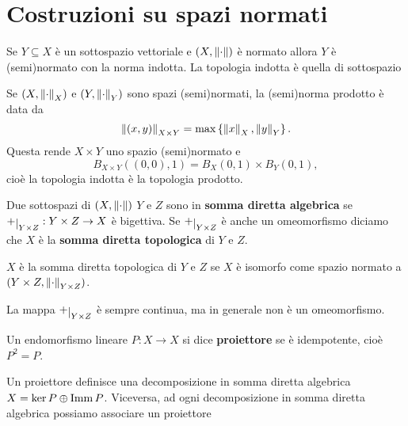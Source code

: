 \chapter{Costruzioni su spazi normati}



\begin{remark}
Se $Y\subseteq X$ \`e un sottospazio vettoriale e $(X,\left\Vert{\cdot}\right\Vert)$ \`e normato allora $Y$ \`e (semi)normato con la norma indotta. La topologia indotta \`e quella di sottospazio
\end{remark}

\begin{definition}
    Se $(X,\left\Vert{\cdot}\right\Vert_X)$ e $(Y,\left\Vert{\cdot}\right\Vert_Y)$ sono spazi (semi)normati, la (semi)norma prodotto \`e data da
    \[\left\Vert{(x,y)}\right\Vert_{X\times Y}=\max\left\{{\left\Vert{x}\right\Vert_X,\left\Vert{y}\right\Vert_Y}\right\}.\]
    Questa rende $X\times Y$ uno spazio (semi)normato e
    \[B_{X\times Y}((0,0),1)=B_X(0,1)\times B_Y(0,1),\]
    cio\`e la topologia indotta \`e la topologia prodotto.
\end{definition}

\begin{definition}
Due sottospazi di $(X,\left\Vert{\cdot}\right\Vert)$ $Y$ e $Z$ sono in \textbf{somma diretta algebrica} se $+\res{Y\times Z}:Y\times Z\to X$ \`e bigettiva. Se $+\res{Y\times Z}$ \`e anche un omeomorfismo diciamo che $X$ \`e la \textbf{somma diretta topologica} di $Y$ e $Z$.
\end{definition}

\begin{remark}
$X$ \`e la somma diretta topologica di $Y$ e $Z$ se $X$ \`e isomorfo come spazio normato a $(Y\times Z,\left\Vert{\cdot}\right\Vert_{Y\times Z})$.
\end{remark}

\begin{remark}
La mappa $+\res{Y\times Z}$ \`e sempre continua, ma in generale non \`e un omeomorfismo.
\end{remark}

\begin{definition}[Proiettore]
Un endomorfismo lineare $P:X\to X$ si dice \textbf{proiettore} se \`e idempotente, cio\`e $P^2=P$.
\end{definition}

\begin{remark}
Un proiettore definisce una decomposizione in somma diretta algebrica $X=\ker P\oplus \operatorname{Imm} P$. Viceversa, ad ogni decomposizione in somma diretta algebrica possiamo associare un proiettore
\end{remark}

